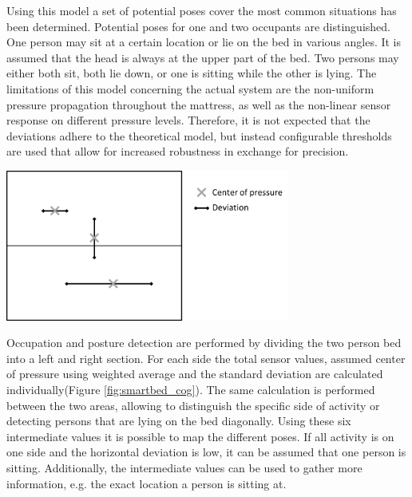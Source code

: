 Using this model a set of potential poses cover the most common situations has been determined. Potential poses for one and two occupants are distinguished. One person may sit at a certain location or lie on the bed in various angles. It is assumed that the head is always at the upper part of the bed. Two persons may either both sit, both lie down, or one is sitting while the other is lying. 
The limitations of this model concerning the actual system are the non-uniform pressure propagation throughout the mattress, as well as the non-linear sensor response on different pressure levels. Therefore, it is not expected that the deviations adhere to the theoretical model, but instead configurable thresholds are used that allow for increased robustness in exchange for precision.

\begin{minipage}{\linewidth}
\centering
\includegraphics[width=0.7\textwidth]{images/smartbed_cog}
\label{fig:smartbed_cog}
\end{minipage}

Occupation and posture detection are performed by dividing the two person bed into a left and right section. For each side the total sensor values, assumed center of pressure using weighted average and the standard deviation are calculated individually(Figure \ref{fig:smartbed_cog}). The same calculation is performed between the two areas, allowing to distinguish the specific side of activity or detecting persons that are lying on the bed diagonally.
Using these six intermediate values it is possible to map the different poses. If all activity is on one side and the horizontal deviation is low, it can be assumed that one person is sitting. Additionally, the intermediate values can be used to gather more information, e.g. the exact location a person is sitting at. 

